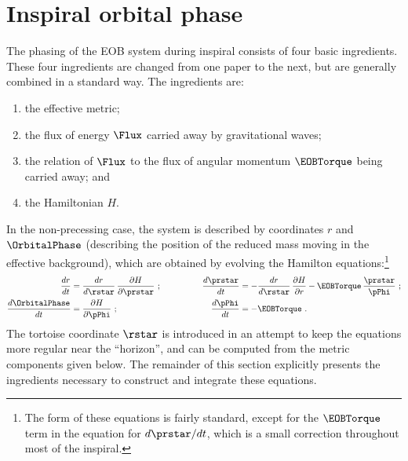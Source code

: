 \documentclass[twoside, aps, prd, letterpaper, noshowpacs, %
amsmath, amssymb, amsfonts, nofootinbib, floatfix, notitlepage]%
{revtex4-1}
\begin{document}
\section{Inspiral orbital phase}
\label{sec:InspiralOrbitalPhase}
The phasing of the EOB system during inspiral consists of four basic
ingredients.  These four ingredients are changed from one paper to the
next, but are generally combined in a standard way.  The ingredients
are:
\begin{enumerate}
 \item the effective metric;
 \item the flux of energy $\Flux$ carried away by gravitational waves;
 \item the relation of $\Flux$ to the flux of angular momentum
  $\EOBTorque$ being carried away; and
 \item the Hamiltonian $H$.
\end{enumerate}
In the non-precessing case, the system is described by coordinates $r$
and $\OrbitalPhase$ (describing the position of the reduced mass
moving in the effective background), which are obtained by evolving
the Hamilton equations:\footnote{The form of these equations is fairly
  standard, except for the $\EOBTorque$ term in the equation for
  $d\prstar/dt$, which is a small correction throughout most of the
  inspiral.}
\begin{equation}
  \label{eq:HamiltonEquations}
  \begin{aligned}
    \frac{dr}{dt} &= \frac{dr}{d\rstar}\, \frac{\partial H}
    {\partial \prstar}~; \qquad \qquad & \frac{d \prstar}{d t} &=
    -\frac{dr}{d\rstar}\, \frac{\partial H} {\partial r}
    -\EOBTorque\, \frac{\prstar}
    {\pPhi}~;
    \\
    \frac{d \OrbitalPhase}{d t} &= \frac{\partial H} {\partial
      \pPhi}~; & \frac{d \pPhi}{d t} &= -\EOBTorque~.
  \end{aligned}
\end{equation}
The tortoise coordinate $\rstar$ is introduced in an attempt to keep
the equations more regular near the ``horizon'', and can be computed
from the metric components given below.  The remainder of this section
explicitly presents the ingredients necessary to construct and
integrate these equations.
\end{document}
